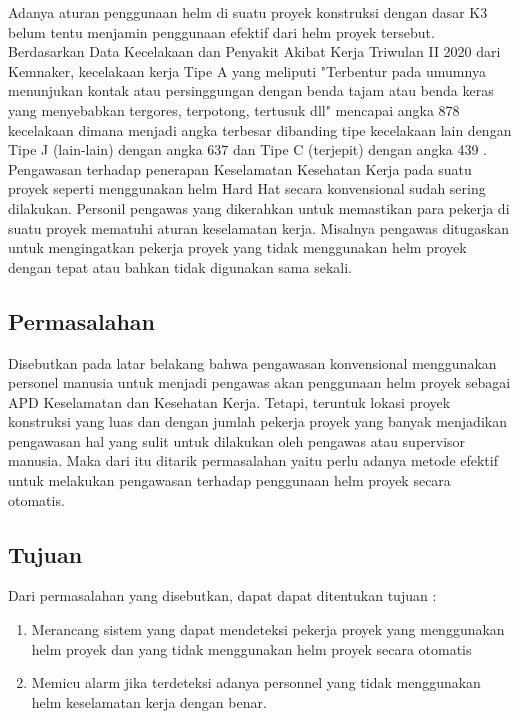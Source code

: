 Adanya aturan penggunaan helm di suatu proyek konstruksi dengan dasar K3 belum tentu menjamin penggunaan efektif dari helm proyek tersebut. 
Berdasarkan Data Kecelakaan dan Penyakit Akibat Kerja Triwulan II 2020 dari Kemnaker, kecelakaan kerja Tipe A yang meliputi "Terbentur pada umumnya menunjukan kontak atau persinggungan dengan benda tajam atau benda keras yang menyebabkan tergores, terpotong, tertusuk dll" mencapai angka 878 kecelakaan dimana menjadi angka terbesar dibanding tipe kecelakaan lain dengan Tipe J (lain-lain) dengan angka 637 dan Tipe C (terjepit) dengan angka 439 \cite{satudata_kecelakaan_kerja}.
Pengawasan terhadap penerapan Keselamatan Kesehatan Kerja pada suatu proyek seperti menggunakan helm Hard Hat secara konvensional sudah sering dilakukan. Personil pengawas yang dikerahkan untuk memastikan para pekerja di suatu proyek mematuhi aturan keselamatan kerja. Misalnya pengawas ditugaskan untuk mengingatkan pekerja proyek yang tidak menggunakan helm proyek dengan tepat atau bahkan tidak digunakan sama sekali.\cite{li2020deep}

\subsection{Permasalahan}
\label{sec:permasalahan}

Disebutkan pada latar belakang bahwa pengawasan konvensional menggunakan personel manusia untuk menjadi pengawas akan penggunaan helm proyek sebagai APD Keselamatan dan Kesehatan Kerja. Tetapi, teruntuk lokasi proyek konstruksi yang luas dan dengan jumlah pekerja proyek yang banyak menjadikan pengawasan hal yang sulit untuk dilakukan oleh pengawas atau supervisor manusia. Maka dari itu ditarik permasalahan yaitu perlu adanya metode efektif untuk melakukan pengawasan terhadap penggunaan helm proyek secara otomatis. 

\subsection{Tujuan}
\label{sec:Tujuan}

Dari permasalahan yang disebutkan, dapat dapat ditentukan tujuan :

\begin{enumerate}[nolistsep]

  \item Merancang sistem yang dapat mendeteksi pekerja proyek yang menggunakan helm proyek dan yang tidak menggunakan helm proyek secara otomatis
  \item Memicu alarm jika terdeteksi adanya personnel yang tidak menggunakan helm keselamatan kerja dengan benar.

\end{enumerate}

